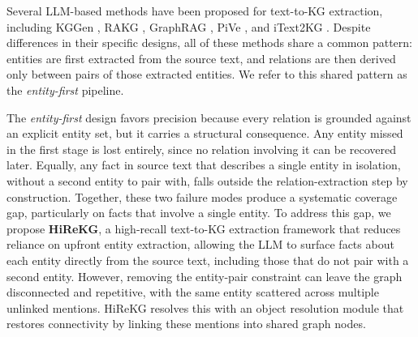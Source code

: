 \documentclass[11pt]{article}
\begin{document}
Several LLM-based methods have been proposed for text-to-KG extraction, including KGGen \citep{kggen}, RAKG \citep{rakg}, GraphRAG \citep{graphrag_microsoft}, PiVe  \citep{pive}, and iText2KG \citep{itext2kg}. Despite differences in their specific designs, all of these methods share a common pattern: entities are first extracted from the source text, and relations are then derived only between pairs of those extracted entities. We refer to this shared pattern as the \emph{entity-first} pipeline. 


The \emph{entity-first} design favors precision because every relation is grounded against an explicit entity set, but it carries a structural consequence. Any entity missed in the first stage is lost entirely, since no relation involving it can be recovered later. Equally, any fact in source text that describes a single entity in isolation, without a second entity to pair with, falls outside the relation-extraction step by construction. Together, these two failure modes produce a systematic coverage gap, particularly on facts that involve a single entity. To address this gap, we propose \textbf{HiReKG}, a high-recall text-to-KG extraction framework that reduces reliance on upfront entity extraction, allowing the LLM to surface facts about each entity directly from the source text, including those that do not pair with a second entity. However, removing the entity-pair constraint can leave the graph disconnected and repetitive, with the same entity scattered across multiple unlinked mentions. HiReKG resolves this with an object resolution module that restores connectivity by linking these mentions into shared graph nodes.

\end{document}
